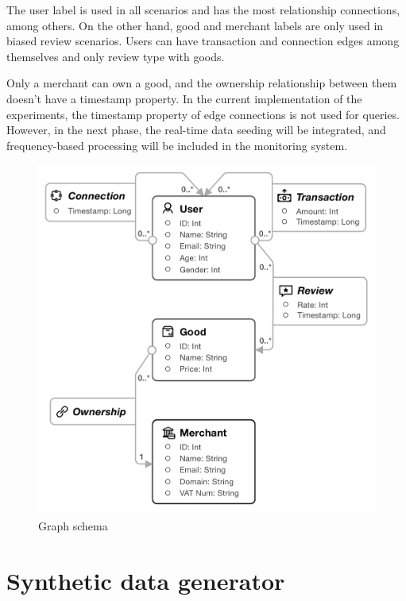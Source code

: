 The user label is used in all scenarios and has the most relationship connections, among others.
On the other hand, good and merchant labels are only used in biased review scenarios.
Users can have transaction and connection edges among themselves and only review type with goods.

Only a merchant can own a good, and the ownership relationship between them doesn't have a timestamp property.
In the current implementation of the experiments, the timestamp property of edge connections is not used for queries.
However, in the next phase, the real-time data seeding will be integrated, and frequency-based processing will be included in the monitoring system.

\begin{figure}[!ht]
    \centering
    \includegraphics[scale=0.3]{figures/schema.png}
    \caption{Graph schema} 
    \label{fig:schema}
\end{figure}

\section{Synthetic data generator} \label{sec:syntetic_data_generator}

